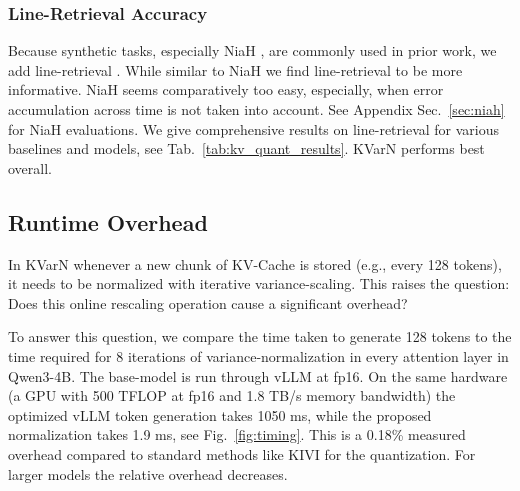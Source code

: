\documentclass{article}
\newcommand{\methodname}{KVarN\xspace}
\begin{document}
\subsubsection{Line-Retrieval Accuracy}
Because synthetic tasks, especially NiaH \cite{kamradt2023needle}, are commonly used in prior work, we add line-retrieval \cite{li2023how_line-retrieval}.
While similar to NiaH we find line-retrieval to be more informative. NiaH seems comparatively too easy, especially, when error accumulation across time is not taken into account.  See Appendix Sec.~\ref{sec:niah} for NiaH evaluations. We give comprehensive results on line-retrieval for various baselines and models, see Tab.~\ref{tab:kv_quant_results}. \methodname performs best overall. 






\subsection{Runtime Overhead}
In \methodname whenever a new chunk of KV-Cache is stored (e.g., every 128 tokens), it needs to be normalized with iterative variance-scaling. This raises the question: Does this online rescaling operation cause a significant overhead?

To answer this question, we compare the time taken to generate 128 tokens to the time required for 8 iterations of variance-normalization in every attention layer in Qwen3-4B. The base-model is run through vLLM \cite{kwon2023efficientvLLM} at fp16. On the same hardware (a GPU with 500 TFLOP at fp16 and 1.8 TB/s memory bandwidth) the optimized vLLM token generation takes 1050 ms, while the proposed normalization takes 1.9 ms, see Fig.~\ref{fig:timing}. This is a 0.18\% measured overhead compared to standard methods like KIVI \cite{KIVI} for the quantization. For larger models the relative overhead decreases. 
\end{document}
